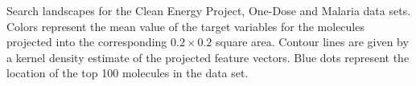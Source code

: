 Search landscapes for the Clean Energy Project, One-Dose and Malaria data sets.  
Colors represent the mean value of the target variables for the molecules projected into the corresponding $0.2 \times 0.2$ square area. Contour lines are given by a kernel density estimate of the projected feature vectors. Blue dots represent the location of the top 100 molecules in the data set.
\label{fig:info_landscapes}